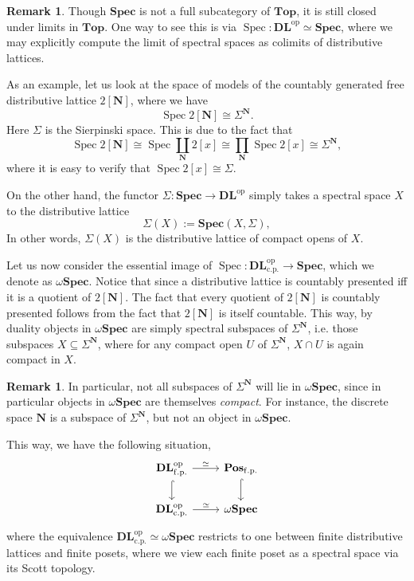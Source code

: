 \documentclass[12pt]{amsart}
\theoremstyle{definition}
\newtheorem{remark}[theorem]{Remark}
\newcommand{\mb}[1]{\mathbf{#1}}
\newcommand{\mr}[1]{\mathrm{#1}}
\newcommand{\Pos}{\mb{Pos}}
\newcommand{\DL}{\mb{DL}}
\newcommand{\op}{^{\mathrm{op}}}
\newcommand{\fp}{_{\mr{f.p.}}}
\newcommand{\cp}{_{\mr{c.p.}}}
\newcommand{\N}{\mb N}
\newcommand{\Topp}{\mb{Top}}
\newcommand{\Spec}{\mb{Spec}}
\newcommand{\wSpec}{\omega\mb{Spec}}
\newcommand{\spec}{\operatorname{Spec}}
\begin{document}
\begin{remark}
  Though $\Spec$ is not a full subcategory of $\Topp$, it is still closed under limits in $\Topp$. One way to see this is via $\spec : \DL\op \simeq \Spec$, where we may explicitly compute the limit of spectral spaces as colimits of distributive lattices.
\end{remark}

As an example, let us look at the space of models of the countably generated free distributive lattice $2[\N]$, where we have 
\[ \spec 2[\N] \cong \Sigma^\N. \] 
Here $\Sigma$ is the Sierpinski space. This is due to the fact that
\[ \spec 2[\N] \cong \spec\coprod_{\N} 2[x] \cong \prod_{\N} \spec 2[x] \cong \Sigma^\N, \]
where it is easy to verify that $\spec 2[x] \cong \Sigma$. 

On the other hand, the functor $\Sigma : \Spec \to \DL\op$ simply takes a spectral space $X$ to the distributive lattice 
\[ \Sigma(X) := \Spec(X,\Sigma), \]
In other words, $\Sigma(X)$ is the distributive lattice of compact opens of $X$.

Let us now consider the essential image of $\spec : \DL\cp\op \to \Spec$, which we denote as $\wSpec$. Notice that since a distributive lattice is countably presented iff it is a quotient of $2[\N]$. The fact that every quotient of $2[\N]$ is countably presented follows from the fact that $2[\N]$ is itself countable. This way, by duality objects in $\wSpec$ are simply spectral subspaces of $\Sigma^\N$, i.e. those subspaces $X \subseteq \Sigma^\N$, where for any compact open $U$ of $\Sigma^\N$, $X \cap U$ is again compact in $X$. 

\begin{remark}
  In particular, not all subspaces of $\Sigma^\N$ will lie in $\wSpec$, since in particular objects in $\wSpec$ are themselves \emph{compact}. For instance, the discrete space $\N$ is a subspace of $\Sigma^\N$, but not an object in $\wSpec$.
\end{remark}

This way, we have the following situation,
\[
\begin{tikzcd}
  \DL\fp\op \ar[r, "\simeq"] \ar[d, hook] & \Pos\fp \ar[d, hook] \\ 
  \DL\cp\op \ar[r, "\simeq"] & \wSpec 
\end{tikzcd}
\]
where the equivalence $\DL\cp\op \simeq \wSpec$ restricts to one between finite distributive lattices and finite posets, where we view each finite poset as a spectral space via its Scott topology.
\end{document}
